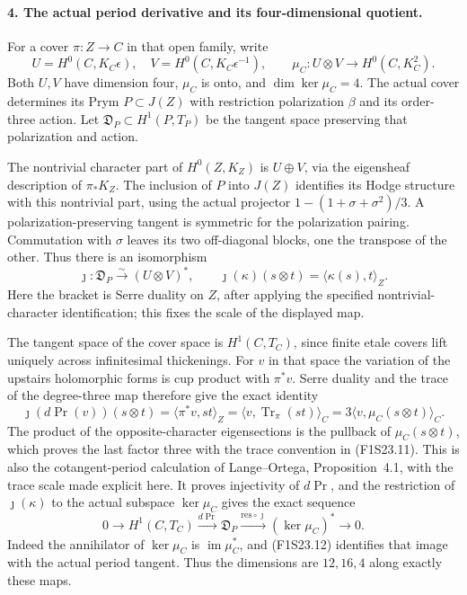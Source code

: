 \paragraph{4. The actual period derivative and its four-dimensional quotient.}
For a cover $\pi:Z\to C$ in that open family, write
\[
 U=H^0(C,K_C\epsilon),\quad V=H^0(C,K_C\epsilon^{-1}),\qquad
 \mu_C:U\otimes V\longrightarrow H^0(C,K_C^2).
 \tag{F1S23.10}
\]
Both $U,V$ have dimension four, $\mu_C$ is onto, and
$\dim\ker\mu_C=4$. The actual cover determines its Prym
$P\subset J(Z)$ with restriction polarization $\beta$ and its
order-three action. Let $\mathfrak D_P\subset H^1(P,T_P)$ be
the tangent space preserving that polarization and action.

The nontrivial character part of $H^0(Z,K_Z)$ is $U\oplus V$,
via the eigensheaf description of $\pi_*K_Z$. The inclusion of
$P$ into $J(Z)$ identifies its Hodge structure with this nontrivial
part, using the actual projector
$1-(1+\sigma+\sigma^2)/3$. A polarization-preserving tangent
is symmetric for the polarization pairing. Commutation with
$\sigma$ leaves its two off-diagonal blocks, one the transpose
of the other. Thus there is an isomorphism
\[
 \jmath:\mathfrak D_P\xrightarrow{\sim}(U\otimes V)^*,
 \qquad
 \jmath(\kappa)(s\otimes t)
          =\langle\kappa(s),t\rangle_Z.
 \tag{F1S23.11}
\]
Here the bracket is Serre duality on $Z$, after applying the
specified nontrivial-character identification; this fixes the
scale of the displayed map.

The tangent space of the cover space is $H^1(C,T_C)$, since
finite etale covers lift uniquely across infinitesimal thickenings.
For $v$ in that space the variation of the upstairs holomorphic
forms is cup product with $\pi^*v$. Serre duality and the trace
of the degree-three map therefore give the exact identity
\[
 \jmath(d\operatorname{Pr}(v))(s\otimes t)
   =\langle\pi^*v,st\rangle_Z
   =\langle v,\operatorname{Tr}_{\pi}(st)\rangle_C
   =3\langle v,\mu_C(s\otimes t)\rangle_C.
 \tag{F1S23.12}
\]
The product of the opposite-character eigensections is the
pullback of $\mu_C(s\otimes t)$, which proves the last factor
three with the trace convention in (F1S23.11).
This is also the cotangent-period calculation of Lange--Ortega,
Proposition~4.1, with the trace scale made explicit here.
It proves injectivity of $d\operatorname{Pr}$, and the restriction
of $\jmath(\kappa)$ to the actual subspace $\ker\mu_C$ gives
the exact sequence
\[
 0\longrightarrow H^1(C,T_C)
  \xrightarrow{d\operatorname{Pr}}\mathfrak D_P
  \xrightarrow{\mathrm{res}\circ\jmath}(\ker\mu_C)^*
  \longrightarrow0.
 \tag{F1S23.13}
\]
Indeed the annihilator of $\ker\mu_C$ is
$\operatorname{im}\mu_C^*$, and (F1S23.12) identifies that
image with the actual period tangent. Thus the dimensions are
$12,16,4$ along exactly these maps.

